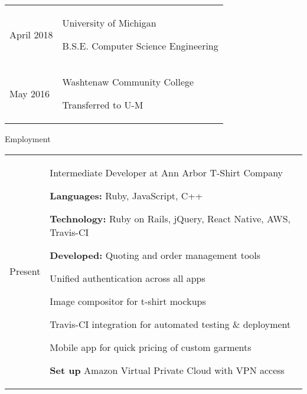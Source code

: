 \documentclass[12pt]{article}
\renewcommand{\section}[1]{{\Huge{#1}}\vspace{2 mm}}
\newenvironment{timeline}
        {\begin{tabular}{p{21 mm}|p{150 mm}}}
        {\end{tabular}}
\newenvironment{timelinetitle}
        {\vspace{-2 mm}\begin{large}}
        {\end{large}\vspace{-1.5 mm}}
\newcommand{\timespan}[2]{{#2}\newline{#1}}
\newcommand{\resumeitem}{\newline\vspace{3 mm}\hspace{3 mm}}
\newcommand{\resumestart}{\vspace{1 mm}}
\begin{document}
\begin{timeline}
\timespan{Sept. 2016}{April 2018}
&
\begin{timelinetitle}
    University of Michigan
\end{timelinetitle}
\hspace{16mm}
B.S.E. Computer Science Engineering
\vspace{3 mm}

\\

\timespan{Sept. 2012}{May 2016}
&
\begin{timelinetitle}
    Washtenaw Community College
\end{timelinetitle}
\hspace{29mm}
Transferred to U-M

\end{timeline}

\vspace{6.0 mm}
\section{Employment}
\hline

\begin{timeline}
\timespan{Feb. 2014}{Present}
&
\begin{timelinetitle}
    Intermediate Developer at Ann Arbor T-Shirt Company
\end{timelinetitle}
\resumestart

\resumeitem \textbf{Languages:} Ruby, JavaScript, C++

\resumeitem \textbf{Technology:} Ruby on Rails, jQuery, React Native, AWS, Travis-CI

\resumeitem \textbf{Developed:} Quoting and order management tools

\resumeitem \hspace{23.5mm} Unified authentication across all apps

\resumeitem \hspace{23.5mm} Image compositor for t-shirt mockups

\resumeitem \hspace{23.5mm} Travis-CI integration for automated testing \& deployment

\resumeitem \hspace{23.5mm} Mobile app for quick pricing of custom garments

\resumeitem \textbf{Set up} Amazon Virtual Private Cloud with VPN access

\end{timeline}
\end{document}
